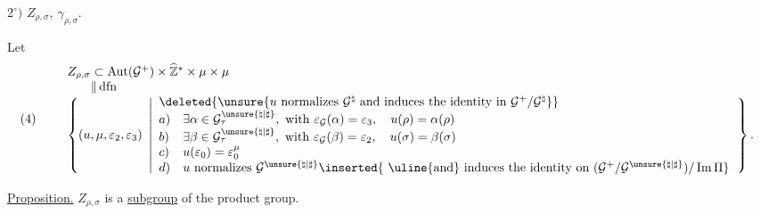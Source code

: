 

$2^\circ)$ \quad $Z_{\rho,\sigma},\ \gamma_{\rho,\sigma}$.

Let
\[
(4)\qquad
\begin{array}{l}
 Z_{\rho,\sigma}\subset
 \operatorname{Aut}(\mathcal{G}^{+})\times
 \widehat{\mathbb{Z}}^{*}\times\mu\times\mu\\
 \phantom{Z_{\rho,\sigma}}\Vert\,\mathrm{dfn}\\
 \left\{(u,\mu,\varepsilon_2,\varepsilon_3)\ \left|
 \begin{array}{ll}
 \multicolumn{2}{l}{\deleted{\unsure{u\ \text{normalizes}\ \mathcal{G}^{\natural}\ 
 \text{and induces the identity in}\ \mathcal{G}^{+}/\mathcal{G}^{\natural}}}}\\
 a)&\exists\alpha\in\mathcal{G}_{\tau}^{\unsure{\natural|\sharp}},
 \ \text{with }\varepsilon_{\mathcal{G}}(\alpha)=\varepsilon_3,
 \quad u(\rho)=\alpha(\rho)\\
 b)&\exists\beta\in\mathcal{G}_{\tau}^{\unsure{\natural|\sharp}},
 \ \text{with }\varepsilon_{\mathcal{G}}(\beta)=\varepsilon_2,
 \quad u(\sigma)=\beta(\sigma)\\
 c)&u(\varepsilon_0)=\varepsilon_0^\mu\\
 d)&u\ \text{normalizes }\mathcal{G}^{\unsure{\natural|\sharp}}
 \inserted{\ \text{\uline{and} induces the identity on }
 (\mathcal{G}^{+}/\mathcal{G}^{\unsure{\natural|\sharp}})/\operatorname{Im}\Pi}
 \end{array}\right.\right\}.
\end{array}
\]

\uline{Proposition.} \quad $Z_{\rho,\sigma}$ is a \uline{subgroup}
of the product group.

